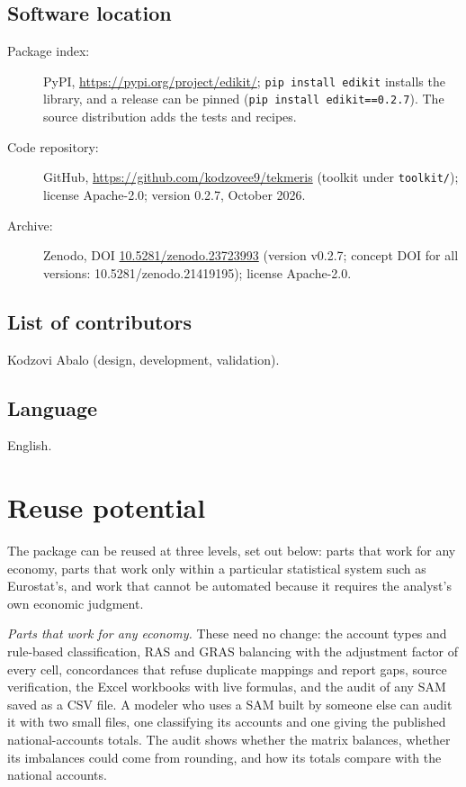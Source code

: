 \documentclass[11pt,a4paper]{article}
\newcommand{\versionnumber}{0.2.7}
\newcommand{\versiondoi}{10.5281/zenodo.23723993}
\begin{document}
\subsection{Software location}
\begin{description}
  \item[Package index:] PyPI, \url{https://pypi.org/project/edikit/};
  \texttt{pip install edikit} installs the library, and a release can be
  pinned (\texttt{pip install edikit==\versionnumber}). The source
  distribution adds the tests and recipes.
  \item[Code repository:] GitHub,
  \url{https://github.com/kodzovee9/tekmeris} (toolkit under
  \texttt{toolkit/}); license Apache-2.0; version \versionnumber,
  October 2026.
  \item[Archive:] Zenodo, DOI
  \href{https://doi.org/\versiondoi}{\versiondoi} (version
  v\versionnumber; concept DOI for all versions:
  10.5281/zenodo.21419195); license Apache-2.0.
\end{description}

\subsection{List of contributors}
Kodzovi Abalo (design, development, validation).

\subsection{Language}
English.

\section{Reuse potential}

The package can be reused at three levels, set out below: parts that work
for any economy, parts that work only within a particular statistical
system such as Eurostat's, and work that cannot be automated because it
requires the analyst's own economic judgment.

\emph{Parts that work for any economy.} These need no change: the account types and rule-based classification, RAS and
GRAS balancing with the adjustment factor of every cell, concordances that
refuse duplicate mappings and report gaps, source verification, the Excel
workbooks with live formulas, and the audit of any SAM saved as a CSV
file. A modeler who uses a SAM built by someone else can audit it with two
small files, one classifying its accounts and one giving the published
national-accounts totals. The audit shows whether the matrix balances,
whether its imbalances could come from rounding, and how its totals
compare with the national accounts.
\end{document}

